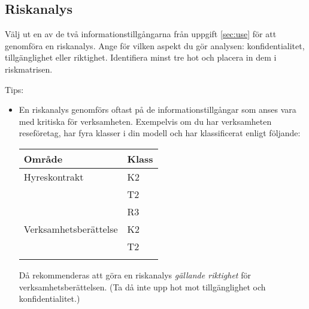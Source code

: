 \documentclass[a4paper]{llncs}
\begin{document}
\subsection{Riskanalys}
\label{sec:risk}

Välj ut en av de två informationstillgångarna från uppgift \ref{sec:use} för 
att genomföra en riskanalys.
Ange för vilken aspekt du gör analysen: konfidentialitet, tillgänglig\-het 
eller riktighet.
Identifiera minst tre hot och placera in dem i riskmatrisen.

\begin{framed}\noindent
  Tips:
  \begin{itemize}
    \item En riskanalys genomförs oftast på de informationstillgångar som anses 
      vara med kritiska för verksamheten.
      Exempelvis om du har verksamheten reseföretag, har fyra klasser i din 
      modell och har klassificerat enligt följande:
      \begin{center}
        \begin{tabular}{ll}
          \textbf{Område} & \textbf{Klass} \\
          \hline\hline
          Hyreskontrakt & K2 \\
                        & T2 \\
                        & R3 \\
          \hline
          Verksamhetsberättelse & K2 \\
                                & T2 \\
                                & \color{red}{R4} \\
          \hline\hline
        \end{tabular}
      \end{center}
      Då rekommenderas att göra en riskanalys \emph{gällande riktighet} för 
      verksamhetsberättelsen.
      (Ta då inte upp hot mot tillgänglighet och konfidentialitet.)


\end{itemize}
\end{framed}
\end{document}
